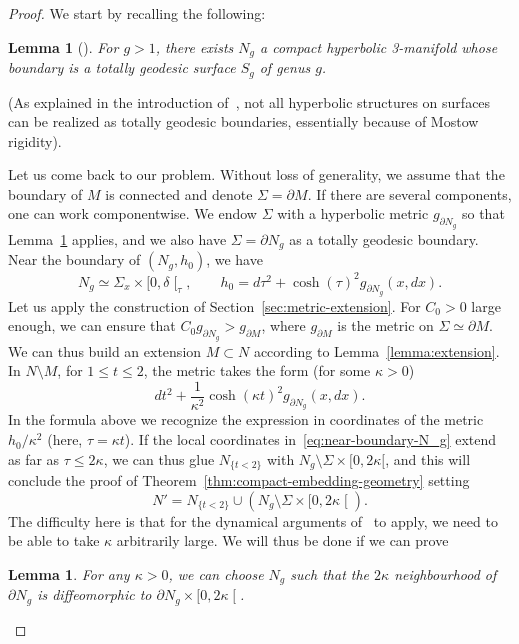 \documentclass[10pt]{amsart}
\newtheorem{lemm}[theo]{Lemma}\newtheorem{prop}[theo]{Proposition}\newtheorem{coro}[theo]{Corollary}\newtheorem{conj}[theo]{Conjecture}
\theoremstyle{definition}\newtheorem{defi}[theo]{Definition}\newtheorem{rema}[theo]{Remark}\newtheorem{exam}[theo]{Example}\newtheorem{exem}[theo]{Example}\newtheorem{nota}[theo]{Notation}
\theoremstyle{plain}
\begin{document}
\begin{proof}
We start by recalling the following:

\begin{lemm}[{\cite[Theorem~3.3]{Fujii}}]
\label{lemma:Fujii}
For $g>1$, there exists $N_g$ a compact hyperbolic 3-manifold whose boundary is a totally geodesic surface $S_g$ of genus $g$.
\end{lemm}

(As explained in the introduction of~\cite{Fujii}, not all hyperbolic structures on surfaces can be realized as totally geodesic boundaries, essentially because of Mostow rigidity).

Let us come back to our problem. Without loss of generality, we assume that the boundary of $M$ is connected and denote $\Sigma=\partial M$. If there are several components, one can work componentwise. We endow $\Sigma$ with a hyperbolic metric $g_{\partial N_g}$ so that Lemma~\ref{lemma:Fujii} applies, and we also have $\Sigma = \partial N_g$ as a totally geodesic boundary. Near the boundary of $(N_g, h_0)$, we have
\begin{equation}\label{eq:near-boundary-N_g}
N_g \simeq \Sigma_x \times [0, \delta\mathclose{[}_\tau,\qquad h_0 = d\tau^2 + \cosh(\tau)^2 g_{\partial N_g}(x,dx).
\end{equation}
Let us apply the construction of Section~\ref{sec:metric-extension}. For $C_0>0$ large enough, we can ensure that $C_0 g_{\partial N_g}> g_{\partial M}$, where $g_{\partial M}$ is the metric on $\Sigma\simeq \partial M$. We can thus build an extension $M\subset N$ according to Lemma~\ref{lemma:extension}. In $N\setminus M$, for $1\leq t\leq 2$, the metric takes the form (for some $\kappa>0$)
\[
dt^2 + \frac{1}{\kappa^2}\cosh(\kappa t)^2 g_{\partial N_g}(x,dx).
\]
In the formula above we recognize the expression in coordinates of the metric $h_0/\kappa^2$ (here, $\tau = \kappa t$). If the local coordinates in~\eqref{eq:near-boundary-N_g} extend as far as $\tau \leq 2\kappa$, we can thus glue $N_{\{t< 2\}}$ with $N_g\setminus \Sigma\times[0,2\kappa[$, and this will conclude the proof of Theorem~\ref{thm:compact-embedding-geometry} setting
\[
N' = N_{\{t<2\}}\cup (N_g\setminus \Sigma\times [0,2\kappa\mathclose{[}).
\]
The difficulty here is that for the dynamical arguments of~\cite{Chen-Erchenko-Gogolev} to apply, we need to be able to take $\kappa$ arbitrarily large. We will thus be done if we can prove

\begin{lemm}\label{lemma:good-N_g}
For any $\kappa>0$, we can choose $N_g$ such that the $2\kappa$ neighbourhood of $\partial N_g$ is diffeomorphic to $\partial N_g \times [0,2\kappa\mathclose{[}$.
\end{lemm}


\end{proof}
\end{document}
